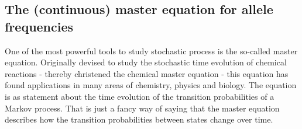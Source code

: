 \subsection{The (continuous) master equation for allele frequencies} \label{sec_master_eq}

One of the most powerful tools to study stochastic process is the so-called
master equation. Originally devised to study the stochastic time evolution of
chemical reactions - thereby christened the chemical master equation - this
equation has found applications in many areas of chemistry, physics and
biology. The equation is as statement about the time evolution of the
transition probabilities of a Markov process. That is just a fancy way of
saying that the master equation describes how the transition probabilities
between states change over time.

